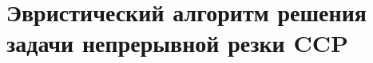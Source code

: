 
\chapter{
  Эвристический алгоритм решения
  задачи непрерывной резки
  CCP
}
\label{ch:ccp}

\lipsum*
